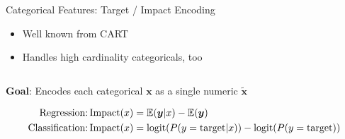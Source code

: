 \begin{frame}{Categorical Features: Target / Impact Encoding}
  \begin{itemize}
    \item Well known from CART
    \item Handles high cardinality categoricals, too
  \end{itemize}

  \begin{columns}
    \begin{column}{0.7\textwidth}


      \textbf{Goal}: Encodes each categorical $\bm{x}$ as a single numeric $\tilde{\bm{x}}$
      
      \vspace*{-0.5cm}  
      {\footnotesize
      \begin{align*}
      \text{Regression:} \operatorname{Impact}(x) &= \operatorname*{\mathbb{E}}(\bm{y} | x) - \operatorname*{\mathbb{E}}(\bm{y}) \\
      \text{Classification:} \operatorname{Impact}(x) &= \operatorname{logit}(P( y = \text{target} | x)) - \operatorname{logit}(P( y = \text{target}))
      \end{align*}
      }
      \vspace*{-0.5cm}  
      \begin{itemize}
      

\end{itemize}
\end{column}
\end{columns}
\end{frame}
